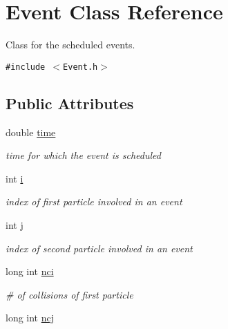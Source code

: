 \hypertarget{classEvent}{
\section{Event Class Reference}
\label{classEvent}
}
Class for the scheduled events.  


{\tt \#include $<$Event.h$>$}

\subsection*{Public Attributes}
\begin{CompactItemize}
\item 
\hypertarget{classEvent_7cf2572f1124c9700c89ff9f01b311bf}{
double \hyperlink{classEvent_7cf2572f1124c9700c89ff9f01b311bf}{time}}
\label{classEvent_7cf2572f1124c9700c89ff9f01b311bf}

\begin{CompactList}\small\item\em time for which the event is scheduled \item\end{CompactList}\item 
\hypertarget{classEvent_31eef2d34054124685a02c5b62828ffa}{
int \hyperlink{classEvent_31eef2d34054124685a02c5b62828ffa}{i}}
\label{classEvent_31eef2d34054124685a02c5b62828ffa}

\begin{CompactList}\small\item\em index of first particle involved in an event \item\end{CompactList}\item 
\hypertarget{classEvent_37d2f4c9ed053cb304290aa558b1c6a6}{
int \hyperlink{classEvent_37d2f4c9ed053cb304290aa558b1c6a6}{j}}
\label{classEvent_37d2f4c9ed053cb304290aa558b1c6a6}

\begin{CompactList}\small\item\em index of second particle involved in an event \item\end{CompactList}\item 
\hypertarget{classEvent_e345959d88c0b9b118ae4450af0665b4}{
long int \hyperlink{classEvent_e345959d88c0b9b118ae4450af0665b4}{nci}}
\label{classEvent_e345959d88c0b9b118ae4450af0665b4}

\begin{CompactList}\small\item\em \# of collisions of first particle \item\end{CompactList}\item 
\hypertarget{classEvent_6b90e4b10bfc784979e43a2e5da28fc6}{
long int \hyperlink{classEvent_6b90e4b10bfc784979e43a2e5da28fc6}{ncj}}
\label{classEvent_6b90e4b10bfc784979e43a2e5da28fc6}


\end{CompactItemize}

